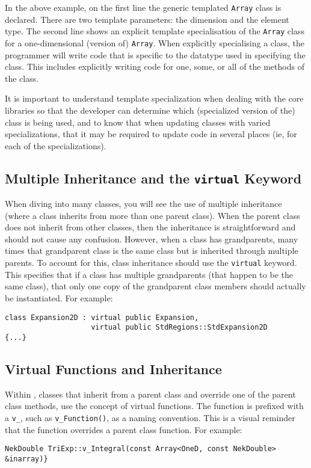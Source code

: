 In the above example, on the first line the generic templated
\lstinline{Array} class is declared. There are two template parameters: the dimension and the element type. The second line shows an explicit
template specialisation of the \lstinline{Array} class for a one-dimensional (version of) \lstinline{Array}.  When explicitly specialising a class, the programmer
will write code that is specific to the datatype used in specifying
the class.  This includes explicitly writing code for one, some, or
all of the methods of the class.

It is important to understand template specialization when dealing
with the {\nek} core libraries so that the developer can
determine which (specialized version of the) class is being used,
and to know that when updating classes with varied specializations,
that it may be required to update code in several places (ie, for
each of the specializations).

\subsection{Multiple Inheritance and the \lstinline{virtual} Keyword}
When diving into many {\nek} classes, you will see the use of multiple
inheritance (where a class inherits from more than one parent
class).  When the parent class does not inherit from other classes,
then the inheritance is straightforward and should not cause any
confusion.  However, when a class has grandparents, many times that
grandparent class is the same class but is inherited through multiple
parents.  To account for this, class inheritance should use the
\lstinline{virtual} keyword.  This specifies that if a class has multiple
grandparents (that happen to be the same class), that only one copy of
the grandparent class members should actually be instantiated. For example:
\begin{lstlisting}
class Expansion2D : virtual public Expansion,
                    virtual public StdRegions::StdExpansion2D
{...}
\end{lstlisting}


\subsection{Virtual Functions and Inheritance}
Within {\nek}, classes
that inherit from a parent class and override one of the parent
class methods, use the concept of virtual functions. The function is prefixed with a \lstinline{v_}, such as \lstinline{v_Function()}, as a naming convention.  This is a visual reminder that the function overrides a parent class function. For example:
\begin{lstlisting}
NekDouble TriExp::v_Integral(const Array<OneD, const NekDouble> &inarray)}
\end{lstlisting}

